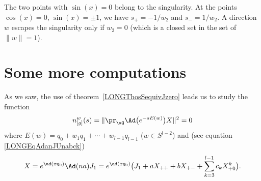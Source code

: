 The two points with $\sin(x)=0$ belong to the singularity. At the points $\cos(x)=0$, $\sin(x)=\pm1$, we have $s_+=-1/w_2$ and $s_-=1/w_2$. A direction $w$ escapes the singularity only if $w_2=0$ (which is a closed set in the set of $\| w \|=1$).


\newcommand{\CaptionFigSFdgHdO}{Points in $\pi(K)$ are classified by their angle in $\SO(2)$. Red points are part of the singularity, points in the black zone belong to the black hole and points in the green zone are free. The upper and lower boundaries belong to the horizon.}



%
\section{Some more computations}
%
\label{LONGSecMoreComputations}

As we saw, the use of theorem~\ref{LONGThosSequivJzero} leads us to study the function
\begin{equation}            \label{LONGEqprSqbignor}
	n_{[g]}^w(s)=\|   \pr_{\sQ} \Ad\big(  e^{-s E(w)} \big)X  \|^2=0
\end{equation}
where $E(w)=q_0+w_1q_1+\cdots+w_{l-1}q_{l-1}$ ($w\in S^{l-2}$) and (see equation \eqref{LONGEqAdanJUnabck})
\begin{equation}
	X=e^{\ad(xq_0)}\Ad(na)J_1=e^{\ad(xq_0)}\big(  J_1+aX_{++}+bX_{+-}+\sum_{k=3}^{l-1}c_kX_{+0}^k\big).
\end{equation}

